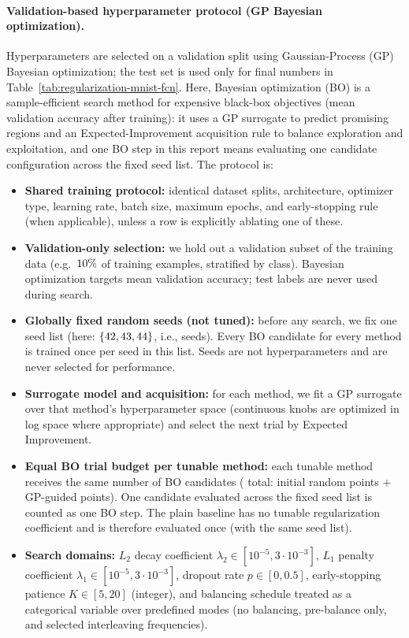 \paragraph{Validation-based hyperparameter protocol (GP Bayesian optimization).}
Hyperparameters are selected on a validation split using Gaussian-Process (GP) Bayesian optimization; the test set is used only for final numbers in Table~\ref{tab:regularization-mnist-fcn}. Here, Bayesian optimization (BO) is a sample-efficient search method for expensive black-box objectives (mean validation accuracy after training): it uses a GP surrogate to predict promising regions and an Expected-Improvement acquisition rule to balance exploration and exploitation, and one BO step in this report means evaluating one candidate configuration across the fixed seed list. The protocol is:
\begin{itemize}
  \item \textbf{Shared training protocol:} identical dataset splits, architecture, optimizer type, learning rate, batch size, maximum epochs, and early-stopping rule (when applicable), unless a row is explicitly ablating one of these.
  \item \textbf{Validation-only selection:} we hold out a validation subset of the training data (e.g.\ $10\%$ of training examples, stratified by class). Bayesian optimization targets mean validation accuracy; test labels are never used during search.
  \item \textbf{Globally fixed random seeds (not tuned):} before any search, we fix one seed list (here: $\{42, 43, 44\}$, i.e., \NumSeeds{} seeds). Every BO candidate for every method is trained once per seed in this list. Seeds are not hyperparameters and are never selected for performance.
  \item \textbf{Surrogate model and acquisition:} for each method, we fit a GP surrogate over that method's hyperparameter space (continuous knobs are optimized in log space where appropriate) and select the next trial by Expected Improvement.
  \item \textbf{Equal BO trial budget per tunable method:} each tunable method receives the same number of BO candidates (\BOBudgetTotal{} total: \BOBudgetInit{} initial random points + \BOBudgetGuided{} GP-guided points). One candidate evaluated across the fixed seed list is counted as one BO step. The plain baseline has no tunable regularization coefficient and is therefore evaluated once (with the same seed list).
  \item \textbf{Search domains:} $L_2$ decay coefficient $\lambda_2 \in [10^{-5}, 3\cdot10^{-3}]$, $L_1$ penalty coefficient $\lambda_1 \in [10^{-5}, 3\cdot10^{-3}]$, dropout rate $p \in [0,0.5]$, early-stopping patience $K \in [5,20]$ (integer), and balancing schedule treated as a categorical variable over predefined modes (no balancing, pre-balance only, and selected interleaving frequencies).

\end{itemize}
